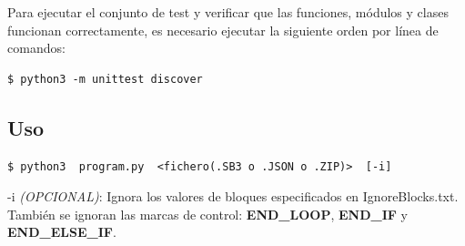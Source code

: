 \documentclass[a4paper, 12pt]{book}
\begin{document}
Para ejecutar el conjunto de test y verificar que las funciones, módulos y clases funcionan correctamente, es necesario ejecutar la siguiente orden por línea de comandos:

\begin{lstlisting}[style=consola,numbers=none]
$ python3 -m unittest discover
\end{lstlisting}

\newpage 

\subsection{Uso}

\begin{lstlisting}[style=consola,numbers=none]
$ python3  program.py  <fichero(.SB3 o .JSON o .ZIP)>  [-i]
\end{lstlisting}

-i \textit{(OPCIONAL)}: Ignora los valores de bloques especificados en IgnoreBlocks.txt. También se ignoran las marcas de control: \textbf{END\_LOOP}, \textbf{END\_IF} y \textbf{END\_ELSE\_IF}.
\end{document}
